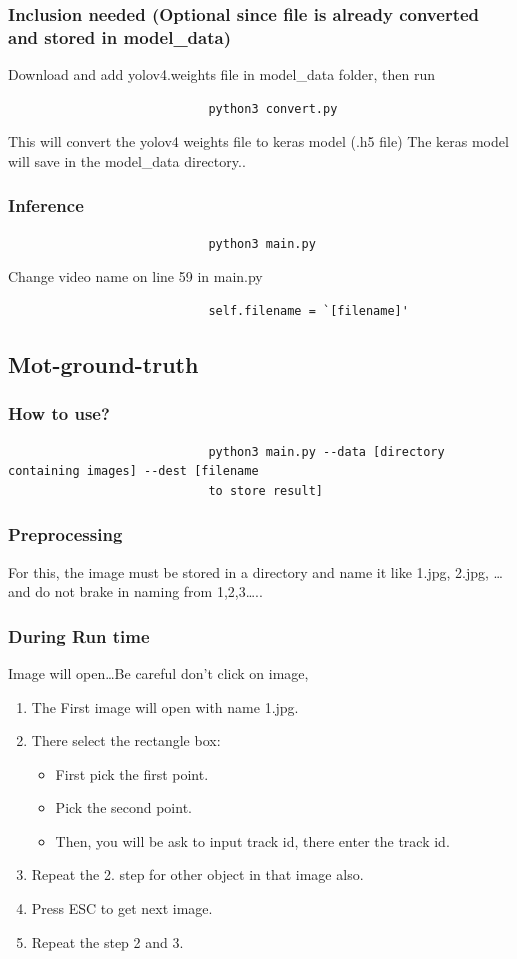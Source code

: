 					\subsubsection*{Inclusion needed (Optional since file is already converted and stored in model\_data)}
						Download and add yolov4.weights file in model\_data folder,
						then run 
						\begin{verbatim}
							python3 convert.py
						\end{verbatim}
						This will convert the yolov4 weights file to keras model (.h5 file) The keras model will save in the model\_data directory..
					\subsubsection*{Inference}
						\begin{verbatim}
							python3 main.py
						\end{verbatim}
						Change video name on line 59 in main.py
						\begin{verbatim}
							self.filename = `[filename]'
						\end{verbatim}
						\pagebreak
				\subsection*{Mot-ground-truth}
					\subsubsection*{How to use?}
						\begin{verbatim}
							python3 main.py --data [directory containing images] --dest [filename 
							to store result]
						\end{verbatim}
					\subsubsection*{Preprocessing}
						For this, the image must be stored in a directory and name it like 1.jpg, 2.jpg, \ldots and do not brake in naming from 1,2,3\ldots ..
					\subsubsection*{During Run time}
						Image will open\ldots Be careful don't click on image,
						\begin{enumerate} 
							\item The First image will open with name 1.jpg.
							\item There select the rectangle box:
								\begin{itemize}
									\item First pick the first point.
									\item Pick the second point.
									\item Then, you will be ask to input track id, there enter the track id.
								\end{itemize}
							\item Repeat the 2. step for other object in that image also.
							\item Press ESC to get next image.
							\item Repeat the step 2 and 3.
						\end{enumerate}
